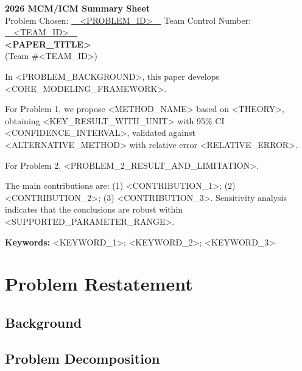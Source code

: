\documentclass[12pt,letterpaper]{article}
\begin{document}
\begin{center}
  {\Large\bfseries 2026 MCM/ICM Summary Sheet}\\[6pt]
  {\large Problem Chosen: \underline{\ \ <PROBLEM\_ID>\ \ } \quad
   Team Control Number: \underline{\ \ <TEAM\_ID>\ \ }}\\[10pt]
  {\LARGE\bfseries <PAPER\_TITLE>}\\[4pt]
  {\normalsize (Team \#<TEAM\_ID>)}
\end{center}

In <PROBLEM\_BACKGROUND>, this paper develops <CORE\_MODELING\_FRAMEWORK>.

For Problem 1, we propose <METHOD\_NAME> based on <THEORY>, obtaining
<KEY\_RESULT\_WITH\_UNIT> with 95\% CI <CONFIDENCE\_INTERVAL>, validated against
<ALTERNATIVE\_METHOD> with relative error <RELATIVE\_ERROR>.

For Problem 2, <PROBLEM\_2\_RESULT\_AND\_LIMITATION>.

The main contributions are: (1) <CONTRIBUTION\_1>; (2) <CONTRIBUTION\_2>;
(3) <CONTRIBUTION\_3>. Sensitivity analysis indicates that the conclusions
are robust within <SUPPORTED\_PARAMETER\_RANGE>.

\vspace{0.5em}
\noindent\textbf{Keywords:} <KEYWORD\_1>; <KEYWORD\_2>; <KEYWORD\_3>

\newpage


\section{Problem Restatement}
\subsection{Background}
\subsection{Problem Decomposition}
\end{document}
